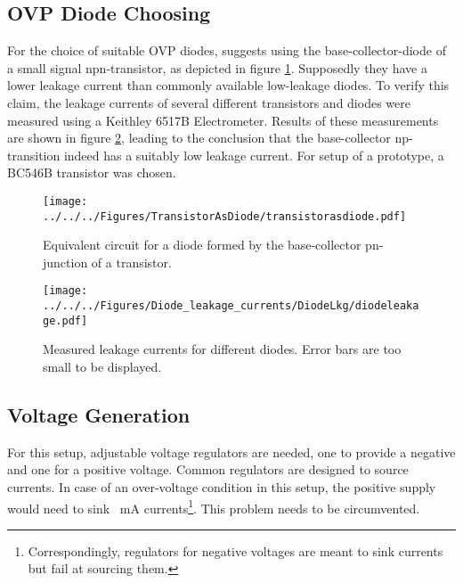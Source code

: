 \subsection{OVP Diode Choosing}
\label{sec:diodeleakage}
For the choice of suitable OVP diodes, \cite{elektrokompendium} suggests using the base-collector-diode of a small signal npn-transistor, as depicted in figure \ref{fig:transistorasdiode}. Supposedly they have a lower leakage current than commonly available low-leakage diodes. To verify this claim, the leakage currents of several different transistors and diodes were measured using a Keithley 6517B Electrometer. Results of these measurements are shown in figure \ref{fig:diodeleakage}, leading to the conclusion that the base-collector np-transition indeed has a suitably low leakage current. For setup of a prototype, a BC546B transistor was chosen.
\begin{figure}
	\centering
		\centering
		\texttt{[image: ../../../Figures/TransistorAsDiode/transistorasdiode.pdf]}
		\caption{Equivalent circuit for a diode formed by the base-collector pn-junction of a transistor.}
		\label{fig:transistorasdiode}
\end{figure}
\begin{figure}
		\centering
		\texttt{[image: ../../../Figures/Diode\_leakage\_currents/DiodeLkg/diodeleakage.pdf]}
		\caption{Measured leakage currents for different diodes. Error bars are too small to be displayed.}
		\label{fig:diodeleakage}
\end{figure}



\subsection{Voltage Generation}
For this setup, adjustable voltage regulators are needed, one to provide a negative and one for a positive voltage. Common regulators are designed to source currents. In case of an over-voltage condition in this setup, the positive supply would need to sink \SI{}{\milli\ampere} currents\footnote{Correspondingly, regulators for negative voltages are meant to sink currents but fail at sourcing them.}. This problem needs to be circumvented.

